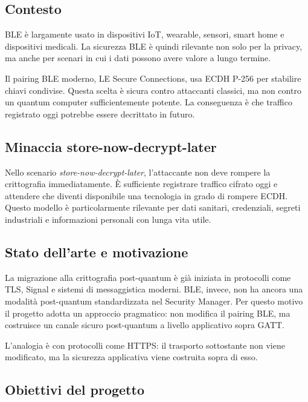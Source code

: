 \documentclass[11pt,a4paper]{article}
\begin{document}
\subsection{Contesto}\label{contesto}

BLE è largamente usato in dispositivi IoT, wearable, sensori, smart home
e dispositivi medicali. La sicurezza BLE è quindi rilevante non solo per
la privacy, ma anche per scenari in cui i dati possono avere valore a
lungo termine.

Il pairing BLE moderno, LE Secure Connections, usa ECDH P-256 per
stabilire chiavi condivise. Questa scelta è sicura contro attaccanti
classici, ma non contro un quantum computer sufficientemente potente. La
conseguenza è che traffico registrato oggi potrebbe essere decrittato in
futuro.

\subsection{Minaccia
store-now-decrypt-later}\label{minaccia-store-now-decrypt-later}

Nello scenario \emph{store-now-decrypt-later}, l'attaccante non deve
rompere la crittografia immediatamente. È sufficiente registrare
traffico cifrato oggi e attendere che diventi disponibile una tecnologia
in grado di rompere ECDH. Questo modello è particolarmente rilevante per
dati sanitari, credenziali, segreti industriali e informazioni personali
con lunga vita utile.

\subsection{Stato dell'arte e
motivazione}\label{stato-dellarte-e-motivazione}

La migrazione alla crittografia post-quantum è già iniziata in
protocolli come TLS, Signal e sistemi di messaggistica moderni. BLE,
invece, non ha ancora una modalità post-quantum standardizzata nel
Security Manager. Per questo motivo il progetto adotta un approccio
pragmatico: non modifica il pairing BLE, ma costruisce un canale sicuro
post-quantum a livello applicativo sopra GATT.

L'analogia è con protocolli come HTTPS: il trasporto sottostante non
viene modificato, ma la sicurezza applicativa viene costruita sopra di
esso.

\subsection{Obiettivi del progetto}\label{obiettivi-del-progetto}
\end{document}
